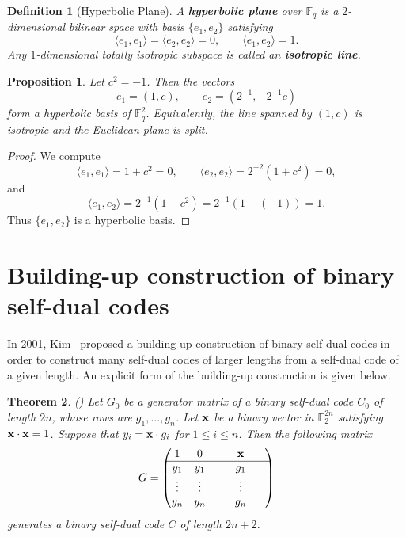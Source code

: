 \documentclass[12pt]{article}
\newtheorem{defn}{Definition}[section]
\newtheorem{theorem}{Theorem}[section]
\newtheorem{prop}[theorem]{Proposition}
\newcommand{\F}{\mathbb{F}}
\begin{document}
\begin{defn}[Hyperbolic Plane]\label{def:hyp}
{\rm
A \textbf{hyperbolic plane} over $\F_q$ is a $2$-dimensional bilinear space with basis $\{e_1,e_2\}$ satisfying
\[
\langle e_1,e_1\rangle = \langle e_2,e_2\rangle = 0,
\qquad
\langle e_1,e_2\rangle = 1.
\]
Any $1$-dimensional totally isotropic subspace is called an \textbf{isotropic line}.
}
\end{defn}

\begin{prop}\label{prop:eucl-hyp}
Let $c^2=-1$. Then the vectors
\[
e_1=(1,c), \qquad e_2=(2^{-1},-2^{-1}c)
\]
form a hyperbolic basis of\/ $\F_q^2$. Equivalently, the line spanned by $(1,c)$ is isotropic and the Euclidean plane is split.
\end{prop}

\begin{proof}
We compute
\[
\langle e_1,e_1\rangle = 1+c^2 = 0,
\qquad
\langle e_2,e_2\rangle = 2^{-2}(1+c^2)=0,
\]
and
\[
\langle e_1,e_2\rangle
= 2^{-1}(1-c^2)
= 2^{-1}(1-(-1))
= 1.
\]
Thus $\{e_1,e_2\}$ is a hyperbolic basis.
\end{proof}

\section{Building-up construction of binary self-dual codes}

In 2001, Kim~\cite{Kim2001} proposed a building-up construction of binary self-dual codes in order to construct many self-dual codes of larger lengths from a self-dual code of a given length. An explicit form of the building-up construction is given below.

\begin{theorem}(\cite[Theorem 1]{Kim2001}) \label{thm-binary-build-1}
Let $G_0$ be a generator matrix of a binary self-dual code $C_0$ of length $2n$, whose rows are $g_1, \dots, g_n$. Let $\bf x$ be a binary vector in $\mathbb F_2^{2n}$ satisfying ${\bf x} \cdot {\bf x} = 1$. Suppose that $y_i ={\bf x} \cdot g_i$ for $1 \le i \le n$. Then the following matrix
\[
G=
\begin{pmatrix}
1 & 0 & ~~~~~ {\bf x} ~~~~~\\
\hline
y_1 &  y_1 & ~~~~~ g_1 ~~~~~\\
\vdots & \vdots & ~~~~~ \vdots ~~~~~ \\
y_{n} & y_{n} & ~~~~~ g_{n} ~~~~~
\end{pmatrix}
\]
generates a binary self-dual code $C$ of length $2n+2$.
\end{theorem}
\end{document}

